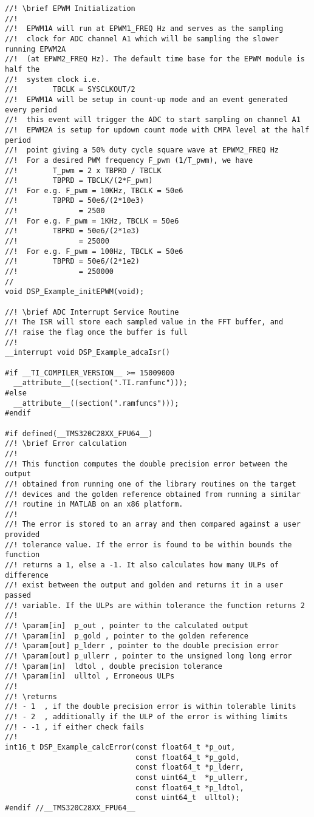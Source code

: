 \begin{lstlisting}[caption=\raggedright{mcu-libs/RLS.h}, frame=single]
//! \brief EPWM Initialization
//!
//!  EPWM1A will run at EPWM1_FREQ Hz and serves as the sampling
//!  clock for ADC channel A1 which will be sampling the slower running EPWM2A
//!  (at EPWM2_FREQ Hz). The default time base for the EPWM module is half the
//!  system clock i.e.
//!        TBCLK = SYSCLKOUT/2
//!  EPWM1A will be setup in count-up mode and an event generated every period
//!  this event will trigger the ADC to start sampling on channel A1
//!  EPWM2A is setup for updown count mode with CMPA level at the half period
//!  point giving a 50% duty cycle square wave at EPWM2_FREQ Hz
//!  For a desired PWM frequency F_pwm (1/T_pwm), we have
//!        T_pwm = 2 x TBPRD / TBCLK
//!        TBPRD = TBCLK/(2*F_pwm)
//!  For e.g. F_pwm = 10KHz, TBCLK = 50e6
//!        TBPRD = 50e6/(2*10e3)
//!              = 2500
//!  For e.g. F_pwm = 1KHz, TBCLK = 50e6
//!        TBPRD = 50e6/(2*1e3)
//!              = 25000
//!  For e.g. F_pwm = 100Hz, TBCLK = 50e6
//!        TBPRD = 50e6/(2*1e2)
//!              = 250000
//
void DSP_Example_initEPWM(void);

//! \brief ADC Interrupt Service Routine
//! The ISR will store each sampled value in the FFT buffer, and
//! raise the flag once the buffer is full
//!
__interrupt void DSP_Example_adcaIsr()

#if __TI_COMPILER_VERSION__ >= 15009000
  __attribute__((section(".TI.ramfunc")));
#else
  __attribute__((section(".ramfuncs")));
#endif

#if defined(__TMS320C28XX_FPU64__)
//! \brief Error calculation
//!
//! This function computes the double precision error between the output
//! obtained from running one of the library routines on the target
//! devices and the golden reference obtained from running a similar
//! routine in MATLAB on an x86 platform.
//!
//! The error is stored to an array and then compared against a user provided
//! tolerance value. If the error is found to be within bounds the function
//! returns a 1, else a -1. It also calculates how many ULPs of difference
//! exist between the output and golden and returns it in a user passed
//! variable. If the ULPs are within tolerance the function returns 2
//!
//! \param[in]  p_out , pointer to the calculated output
//! \param[in]  p_gold , pointer to the golden reference
//! \param[out] p_lderr , pointer to the double precision error
//! \param[out] p_ullerr , pointer to the unsigned long long error
//! \param[in]  ldtol , double precision tolerance
//! \param[in]  ulltol , Erroneous ULPs
//!
//! \returns
//! - 1  , if the double precision error is within tolerable limits
//! - 2  , additionally if the ULP of the error is withing limits
//! - -1 , if either check fails
//!
int16_t DSP_Example_calcError(const float64_t *p_out,
                              const float64_t *p_gold,
                              const float64_t *p_lderr,
                              const uint64_t  *p_ullerr,
                              const float64_t *p_ldtol,
                              const uint64_t  ulltol);
#endif //__TMS320C28XX_FPU64__


\end{lstlisting}
